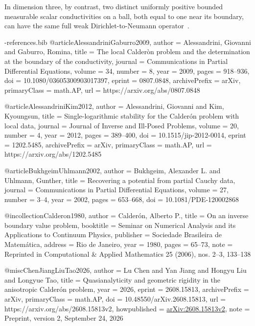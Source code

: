 \documentclass[11pt,a4paper]{article}
\theoremstyle{definition}
\theoremstyle{remark}
\numberwithin{equation}{section}
\begin{document}
In dimension three, by contrast, two distinct uniformly positive bounded
measurable scalar conductivities on a ball, both equal to one near its
boundary, can have the same full weak Dirichlet-to-Neumann
operator~\cite[Theorem~1.1]{OpenAIRoughScalar2026}.
\begin{filecontents*}[overwrite]{\jobname-references.bib}
@article{AlessandriniGaburro2009,
  author = {Alessandrini, Giovanni and Gaburro, Romina},
  title = {The local {Calder{\`o}n} problem and the determination at the boundary of the conductivity},
  journal = {Communications in Partial Differential Equations},
  volume = {34},
  number = {8},
  year = {2009},
  pages = {918--936},
  doi = {10.1080/03605300903017397},
  eprint = {0807.0848},
  archivePrefix = {arXiv},
  primaryClass = {math.AP},
  url = {https://arxiv.org/abs/0807.0848}
}

@article{AlessandriniKim2012,
  author = {Alessandrini, Giovanni and Kim, Kyoungsun},
  title = {Single-logarithmic stability for the {Calder{\'o}n} problem with local data},
  journal = {Journal of Inverse and Ill-Posed Problems},
  volume = {20},
  number = {4},
  year = {2012},
  pages = {389--400},
  doi = {10.1515/jip-2012-0014},
  eprint = {1202.5485},
  archivePrefix = {arXiv},
  primaryClass = {math.AP},
  url = {https://arxiv.org/abs/1202.5485}
}

@article{BukhgeimUhlmann2002,
  author = {Bukhgeim, Alexander L. and Uhlmann, Gunther},
  title = {Recovering a potential from partial {Cauchy} data},
  journal = {Communications in Partial Differential Equations},
  volume = {27},
  number = {3--4},
  year = {2002},
  pages = {653--668},
  doi = {10.1081/PDE-120002868}
}

@incollection{Calderon1980,
  author = {Calder{\'o}n, Alberto P.},
  title = {On an inverse boundary value problem},
  booktitle = {Seminar on Numerical Analysis and its Applications to Continuum Physics},
  publisher = {Sociedade Brasileira de Matem{\'a}tica},
  address = {Rio de Janeiro},
  year = {1980},
  pages = {65--73},
  note = {Reprinted in Computational \& Applied Mathematics 25 (2006), nos. 2--3, 133--138}
}

@misc{ChenJiangLiuTao2026,
  author = {Lu Chen and Yan Jiang and Hongyu Liu and Longyue Tao},
  title = {Quasianalyticity and geometric rigidity in the anisotropic {Calder{\'o}n} problem},
  year = {2026},
  eprint = {2608.15813},
  archivePrefix = {arXiv},
  primaryClass = {math.AP},
  doi = {10.48550/arXiv.2608.15813},
  url = {https://arxiv.org/abs/2608.15813v2},
  howpublished = {\href{https://arxiv.org/abs/2608.15813v2}{arXiv:2608.15813v2}},
  note = {Preprint, version 2, September 24, 2026}
}


\end{filecontents*}
\end{document}
